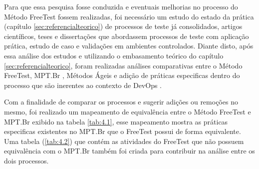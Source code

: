 Para que essa pesquisa fosse conduzida e eventuais melhorias no processo do Método FreeTest fossem realizadas, foi necessário um estudo do estado da prática (capítulo \ref{sec:referencialteorico}) de processos de teste já consolidados, artigos científicos, teses e dissertações que abordassem processos de teste com aplicação prática, estudo de caso e validações em ambientes controlados. Diante disto, após essa análise dos estudos e utilizando o embasamento teórico do capítulo \ref{sec:referencialteorico}, foram realizadas análises comparativas entre o Método FreeTest, MPT.Br \cite{GuiaMPTbr}, Métodos Ágeis \cite{Beck2001} e adição de práticas especificas dentro do processo que são inerentes ao contexto de DevOps \cite{Debois2008}. 

Com a finalidade de comparar os processos e sugerir adições ou remoções no mesmo, foi realizado um mapeamento de equivalência entre o Método FreeTest e MPT.Br exibido na tabela \ref{tab:4.1}, esse mapeamento mostra as práticas especificas existentes no MPT.Br que o FreeTest possui de forma equivalente. Uma tabela (\ref{tab:4.2}) que contém as atividades do FreeTest que não possuem equivalência com o MPT.Br também foi criada para contribuir na análise entre os dois processos.

